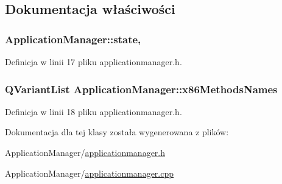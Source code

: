 \subsection{Dokumentacja właściwości}
\hypertarget{class_application_manager_a930a84127f404aa07e142c5b37dfe128}{
\subsubsection[{state}]{ Application\-Manager\-::state\hspace{0.3cm}{\ttfamily [read]}, {\ttfamily [write]}}}\label{class_application_manager_a930a84127f404aa07e142c5b37dfe128}


Definicja w linii 17 pliku applicationmanager.\-h.

\hypertarget{class_application_manager_a04d639af3af2e31840e42bfe72f99a0c}{
\subsubsection[{x86\-Methods\-Names}]{\setlength{\rightskip}{0pt plus 5cm}Q\-Variant\-List Application\-Manager\-::x86\-Methods\-Names\hspace{0.3cm}{\ttfamily [read]}}}\label{class_application_manager_a04d639af3af2e31840e42bfe72f99a0c}


Definicja w linii 18 pliku applicationmanager.\-h.



Dokumentacja dla tej klasy została wygenerowana z plików\-:\begin{DoxyCompactItemize}
\item 
Application\-Manager/\hyperlink{applicationmanager_8h}{applicationmanager.\-h}\item 
Application\-Manager/\hyperlink{applicationmanager_8cpp}{applicationmanager.\-cpp}\end{DoxyCompactItemize}
